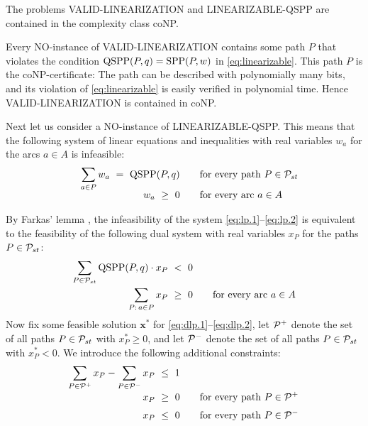 \begin{lemma}
\label{le:coNP}
The problems VALID-LINEARIZATION and LINEARIZABLE-QSPP are contained in the complexity class coNP.
\end{lemma}
\proof
Every NO-instance of VALID-LINEARIZATION contains some path $P$ that violates the condition
$\text{QSPP}(P,q)=\text{SPP}(P,w)$ in \eqref{eq:linearizable}.
This path $P$ is the coNP-certificate: The path can be described with polynomially many bits,
and its violation of \eqref{eq:linearizable} is easily verified in polynomial time.
Hence VALID-LINEARIZATION is contained in coNP.

Next let us consider a NO-instance of LINEARIZABLE-QSPP.
This means that the following system of linear equations and inequalities with real 
variables $w_a$ for the arcs $a\in A$ is infeasible:
\begin{align}
\sum_{a\in P} w_a~=~\qspp(P,q) &\qquad\text{for every path $P\in\ppp$} \label{eq:lp.1} \\[-1.2ex]
              w_a~\ge~0        &\qquad\text{for every arc $a\in A$}    \label{eq:lp.2} \\[-2.5ex]
\hphantom{\sum_{P\in\ppp} \qspp(P,q)\cdot x_P~<~0} &&                  \nonumber
\end{align}
By Farkas' lemma \cite{Farkas1902}, the infeasibility of the system \eqref{eq:lp.1}--\eqref{eq:lp.2}
is equivalent to the feasibility of the following dual system with real variables $x_P$ for the
paths $P\in{\cal P}_{st}$:
\begin{align}
\sum_{P\in{\cal P}_{st}} \text{QSPP}(P,q)\cdot x_P ~<~0 &                                    \label{eq:dlp.1} \\[-0.2ex]
\sum_{P:\,a\in P} x_P             ~\ge~0 &\qquad\text{for every arc $a\in A$} \label{eq:dlp.2} 
\end{align}
Now fix some feasible solution $\pmb x^*$ for \eqref{eq:dlp.1}--\eqref{eq:dlp.2},
let ${\cal P}^+$ denote the set of all paths $P\in{\cal P}_{st}$ with $x^*_P\ge0$, and 
let ${\cal P}^-$ denote the set of all paths $P\in{\cal P}_{st}$ with $x^*_P<0$.
We introduce the following additional constraints:
\begin{align}
\sum_{P\in\pppx}x_P - \sum_{P\in\pppy}x_P  ~\le~1  &                 \label{eq:dlp.3} \\[-0.5ex]
                x_P  ~\ge~0 &\qquad\text{for every path $P\in\pppx$} \label{eq:dlp.4} \\[0.5ex]
                x_P  ~\le~0 &\qquad\text{for every path $P\in\pppy$} \label{eq:dlp.5} \\[-2.5ex] 
\hphantom{\sum_{P\in\ppp} \qspp(P,q)\cdot x_P~<~0} &&                \nonumber
\end{align}
